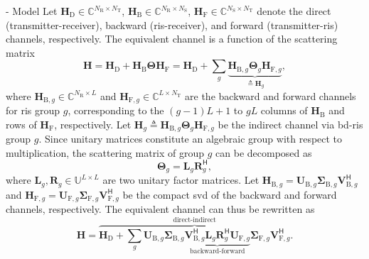 \documentclass[journal]{IEEEtran}
\begin{document}
\begin{section}{- Model}
	Let $\mathbf{H}_\mathrm{D} \in \mathbb{C}^{N_\mathrm{R} \times N_\mathrm{T}}$, $\mathbf{H}_\mathrm{B} \in \mathbb{C}^{N_\mathrm{R} \times N_\mathrm{S}}$, $\mathbf{H}_\mathrm{F} \in \mathbb{C}^{N_\mathrm{S} \times N_\mathrm{T}}$ denote the direct (transmitter-receiver), backward (\gls{ris}-receiver), and forward (transmitter-\gls{ris}) channels, respectively.
	The equivalent channel is a function of the scattering matrix
	\begin{equation}
		\mathbf{H} = \mathbf{H}_\mathrm{D} + \mathbf{H}_\mathrm{B} \mathbf{\Theta} \mathbf{H}_\mathrm{F} = \mathbf{H}_\mathrm{D} + \sum_g \underbrace{\mathbf{H}_{\mathrm{B},g} \mathbf{\Theta}_g \mathbf{H}_{\mathrm{F},g}}_{\triangleq \mathbf{H}_g},
		\label{eq:channel_equivalent}
	\end{equation}
	where $\mathbf{H}_{\mathrm{B},g} \in \mathbb{C}^{N_\mathrm{R} \times L}$ and $\mathbf{H}_{\mathrm{F},g} \in \mathbb{C}^{L \times N_\mathrm{T}}$ are the backward and forward channels for \gls{ris} group $g$, corresponding to the $(g{-}1)L{+}1$ to $gL$ columns of $\mathbf{H}_\mathrm{B}$ and rows of $\mathbf{H}_\mathrm{F}$, respectively.
	Let $\mathbf{H}_g \triangleq \mathbf{H}_{\mathrm{B},g} \mathbf{\Theta}_g \mathbf{H}_{\mathrm{F},g}$ be the indirect channel via \gls{bd}-\gls{ris} group $g$.
	Since unitary matrices constitute an algebraic group with respect to multiplication, the scattering matrix of group $g$ can be decomposed as
	\begin{equation}
		\mathbf{\Theta}_g = \mathbf{L}_g \mathbf{R}_g^\mathsf{H},
	\end{equation}
	where $\mathbf{L}_g, \mathbf{R}_g \in \mathbb{U}^{L \times L}$ are two unitary factor matrices.
	Let $\mathbf{H}_{\mathrm{B},g} = \mathbf{U}_{\mathrm{B},g} \mathbf{\Sigma}_{\mathrm{B},g} \mathbf{V}_{\mathrm{B},g}^\mathsf{H}$ and $\mathbf{H}_{\mathrm{F},g} = \mathbf{U}_{\mathrm{F},g} \mathbf{\Sigma}_{\mathrm{F},g} \mathbf{V}_{\mathrm{F},g}^\mathsf{H}$ be the compact \gls{svd} of the backward and forward channels, respectively.
	The equivalent channel can thus be rewritten as
	\begin{equation}
		\mathbf{H} = \overbrace{\mathbf{H}_\mathrm{D} + \sum_g \mathbf{U}_{\mathrm{B},g} \mathbf{\Sigma}_{\mathrm{B},g} \underbrace{\mathbf{V}_{\mathrm{B},g}^\mathsf{H} \mathbf{L}_g \mathbf{R}_g^\mathsf{H} \mathbf{U}_{\mathrm{F},g}}_\text{backward-forward} \mathbf{\Sigma}_{\mathrm{F},g} \mathbf{V}_{\mathrm{F},g}^\mathsf{H}}^\text{direct-indirect}.
		\label{eq:channel_equivalent_svd}
	\end{equation}


\end{section}
\end{document}

